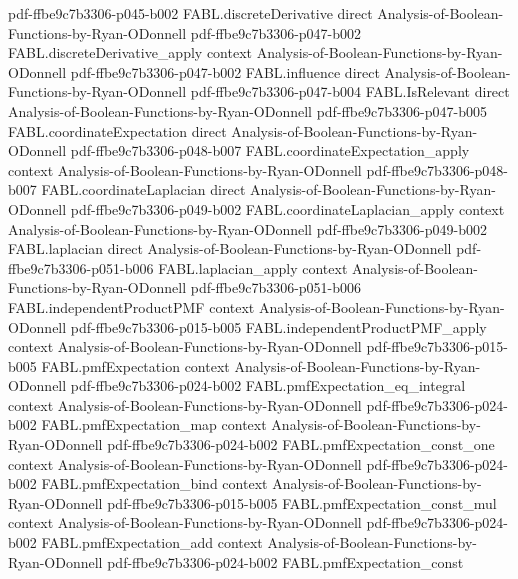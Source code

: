\begin{theorem}
  {pdf-ffbe9c7b3306-p045-b002}
\proofstep
  {FABL.discreteDerivative}
  {direct}
  {Analysis-of-Boolean-Functions-by-Ryan-ODonnell}
  {pdf-ffbe9c7b3306-p047-b002}
\proofstep
  {FABL.discreteDerivative_apply}
  {context}
  {Analysis-of-Boolean-Functions-by-Ryan-ODonnell}
  {pdf-ffbe9c7b3306-p047-b002}
\proofstep
  {FABL.influence}
  {direct}
  {Analysis-of-Boolean-Functions-by-Ryan-ODonnell}
  {pdf-ffbe9c7b3306-p047-b004}
\proofstep
  {FABL.IsRelevant}
  {direct}
  {Analysis-of-Boolean-Functions-by-Ryan-ODonnell}
  {pdf-ffbe9c7b3306-p047-b005}
\proofstep
  {FABL.coordinateExpectation}
  {direct}
  {Analysis-of-Boolean-Functions-by-Ryan-ODonnell}
  {pdf-ffbe9c7b3306-p048-b007}
\proofstep
  {FABL.coordinateExpectation_apply}
  {context}
  {Analysis-of-Boolean-Functions-by-Ryan-ODonnell}
  {pdf-ffbe9c7b3306-p048-b007}
\proofstep
  {FABL.coordinateLaplacian}
  {direct}
  {Analysis-of-Boolean-Functions-by-Ryan-ODonnell}
  {pdf-ffbe9c7b3306-p049-b002}
\proofstep
  {FABL.coordinateLaplacian_apply}
  {context}
  {Analysis-of-Boolean-Functions-by-Ryan-ODonnell}
  {pdf-ffbe9c7b3306-p049-b002}
\proofstep
  {FABL.laplacian}
  {direct}
  {Analysis-of-Boolean-Functions-by-Ryan-ODonnell}
  {pdf-ffbe9c7b3306-p051-b006}
\proofstep
  {FABL.laplacian_apply}
  {context}
  {Analysis-of-Boolean-Functions-by-Ryan-ODonnell}
  {pdf-ffbe9c7b3306-p051-b006}
\proofstep
  {FABL.independentProductPMF}
  {context}
  {Analysis-of-Boolean-Functions-by-Ryan-ODonnell}
  {pdf-ffbe9c7b3306-p015-b005}
\proofstep
  {FABL.independentProductPMF_apply}
  {context}
  {Analysis-of-Boolean-Functions-by-Ryan-ODonnell}
  {pdf-ffbe9c7b3306-p015-b005}
\proofstep
  {FABL.pmfExpectation}
  {context}
  {Analysis-of-Boolean-Functions-by-Ryan-ODonnell}
  {pdf-ffbe9c7b3306-p024-b002}
\proofstep
  {FABL.pmfExpectation_eq_integral}
  {context}
  {Analysis-of-Boolean-Functions-by-Ryan-ODonnell}
  {pdf-ffbe9c7b3306-p024-b002}
\proofstep
  {FABL.pmfExpectation_map}
  {context}
  {Analysis-of-Boolean-Functions-by-Ryan-ODonnell}
  {pdf-ffbe9c7b3306-p024-b002}
\proofstep
  {FABL.pmfExpectation_const_one}
  {context}
  {Analysis-of-Boolean-Functions-by-Ryan-ODonnell}
  {pdf-ffbe9c7b3306-p024-b002}
\proofstep
  {FABL.pmfExpectation_bind}
  {context}
  {Analysis-of-Boolean-Functions-by-Ryan-ODonnell}
  {pdf-ffbe9c7b3306-p015-b005}
\proofstep
  {FABL.pmfExpectation_const_mul}
  {context}
  {Analysis-of-Boolean-Functions-by-Ryan-ODonnell}
  {pdf-ffbe9c7b3306-p024-b002}
\proofstep
  {FABL.pmfExpectation_add}
  {context}
  {Analysis-of-Boolean-Functions-by-Ryan-ODonnell}
  {pdf-ffbe9c7b3306-p024-b002}
\proofstep
  {FABL.pmfExpectation_const}

\end{theorem}
